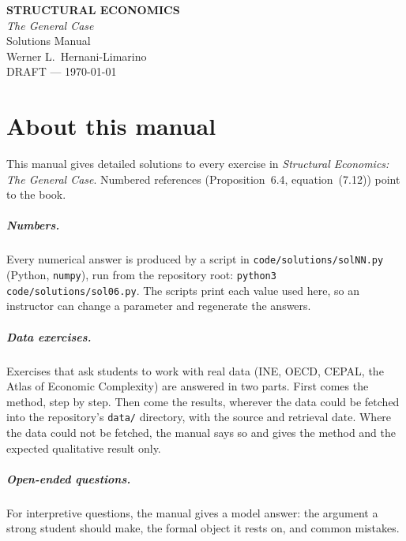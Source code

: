 \documentclass[12pt,a4paper,openright,twoside]{book}
\begin{document}
\frontmatter
\thispagestyle{empty}
\vspace*{3cm}
\begin{center}
{\fontsize{26}{32}\selectfont\bfseries STRUCTURAL ECONOMICS}\\[0.8em]
{\Large\itshape The General Case}\\[2.5cm]
{\LARGE Solutions Manual}\\[3cm]
{\Large Werner L.\ Hernani-Limarino}\\[4cm]
{\large DRAFT --- \today}
\end{center}
\clearpage

\chapter*{About this manual}
This manual gives detailed solutions to every exercise in \emph{Structural Economics: The General Case}.
Numbered references (Proposition~6.4, equation~(7.12)) point to the book.

\paragraph{Numbers.}
Every numerical answer is produced by a script in \texttt{code/solutions/solNN.py} (Python, \texttt{numpy}), run from the repository root: \texttt{python3 code/solutions/sol06.py}.
The scripts print each value used here, so an instructor can change a parameter and regenerate the answers.

\paragraph{Data exercises.}
Exercises that ask students to work with real data (INE, OECD, CEPAL, the Atlas of Economic Complexity) are answered in two parts.
First comes the method, step by step.
Then come the results, wherever the data could be fetched into the repository's \texttt{data/} directory, with the source and retrieval date.
Where the data could not be fetched, the manual says so and gives the method and the expected qualitative result only.

\paragraph{Open-ended questions.}
For interpretive questions, the manual gives a model answer: the argument a strong student should make, the formal object it rests on, and common mistakes.

\tableofcontents
\end{document}
